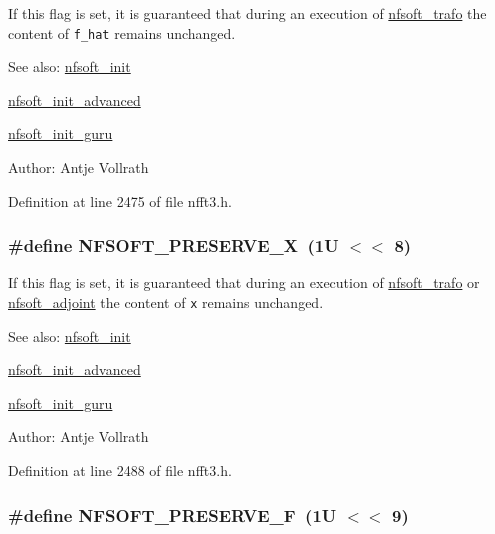 If this flag is set, it is guaranteed that during an execution of \hyperlink{group__nfsoft_ge243cd75d7571a99eae53818e32355fb}{nfsoft\_\-trafo} the content of {\tt f\_\-hat} remains unchanged. 

\begin{Desc}
\item[See also:]\hyperlink{group__nfsoft_g31c884458165fa204073c6c16c10775e}{nfsoft\_\-init} 

\hyperlink{group__nfsoft_gf4aec4ee2a2a5d56ca27c4f1a7f90b18}{nfsoft\_\-init\_\-advanced} 

\hyperlink{group__nfsoft_g1c13cdd3f82f48fa41acdd313cdc2052}{nfsoft\_\-init\_\-guru} \end{Desc}
\begin{Desc}
\item[Author:]Antje Vollrath \end{Desc}


Definition at line 2475 of file nfft3.h.\hypertarget{group__nfsoft_g2650cbfde4c8259e5059d6e9b91e0ec3}{
\subsubsection{\setlength{\rightskip}{0pt plus 5cm}\#define NFSOFT\_\-PRESERVE\_\-X~(1U $<$$<$ 8)}}
\label{group__nfsoft_g2650cbfde4c8259e5059d6e9b91e0ec3}


If this flag is set, it is guaranteed that during an execution of \hyperlink{group__nfsoft_ge243cd75d7571a99eae53818e32355fb}{nfsoft\_\-trafo} or \hyperlink{group__nfsoft_g08395b1dd90f9a2565685d17460afc5b}{nfsoft\_\-adjoint} the content of {\tt x} remains unchanged. 

\begin{Desc}
\item[See also:]\hyperlink{group__nfsoft_g31c884458165fa204073c6c16c10775e}{nfsoft\_\-init} 

\hyperlink{group__nfsoft_gf4aec4ee2a2a5d56ca27c4f1a7f90b18}{nfsoft\_\-init\_\-advanced} 

\hyperlink{group__nfsoft_g1c13cdd3f82f48fa41acdd313cdc2052}{nfsoft\_\-init\_\-guru} \end{Desc}
\begin{Desc}
\item[Author:]Antje Vollrath \end{Desc}


Definition at line 2488 of file nfft3.h.\hypertarget{group__nfsoft_g629a86dd29a3cf09872755cd82bf7062}{
\subsubsection{\setlength{\rightskip}{0pt plus 5cm}\#define NFSOFT\_\-PRESERVE\_\-F~(1U $<$$<$ 9)}}
\label{group__nfsoft_g629a86dd29a3cf09872755cd82bf7062}



